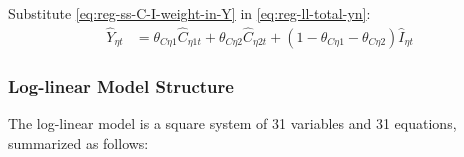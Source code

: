 \documentclass[../thesis.tex]{subfiles}
\begin{document}
Substitute \ref{eq:reg-ss-C-I-weight-in-Y} in \ref{eq:reg-ll-total-yn}:
\begin{align}
	\hat{Y}_{\eta t} &= \theta_{C\eta 1} \hat{C}_{\eta 1 t} + \theta_{C\eta 2} \hat{C}_{\eta 2 t} + (1 - \theta_{C\eta 1} - \theta_{C\eta 2}) \hat{I}_{\eta t} \label{eq:reg-ll-total-yn-2}
\end{align}

\newpage


\subsubsection{Log-linear Model Structure}

The log-linear model is a square system of 31 variables and 31 equations, summarized as follows:
\end{document}
